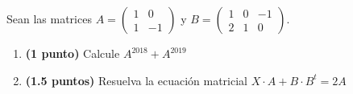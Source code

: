 
Sean las matrices $A=\begin{pmatrix}1&0\\1&-1\end{pmatrix}$ y $B=\begin{pmatrix}1&0&-1\\2&1&0\end{pmatrix}$.
\begin{enumerate}[label=\alph*)]
\item \textbf{(1 punto)} Calcule $A^{2018}+A^{2019}$
\item \textbf{(1.5 puntos)} Resuelva la ecuación matricial $X\cdot A+B\cdot B^t=2A$
\end{enumerate}
